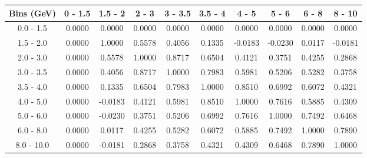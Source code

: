 \documentclass[aps, prd, reprint,showpacs,  preprintnumbers,amsmath,amssymb,superscriptaddress, nofootinbib]{revtex4-1}
\makeatletter
\renewenvironment{table}
  {\def\@captype{table}}
  {}
\makeatother
\begin{document}
\vspace{0.3cm}


\begin{table}
\centering
\begin{tabular}{cccccccccc}
\hline
Bins (GeV) & 0 - 1.5 & 1.5 - 2 & 2 - 3 & 3 - 3.5 & 3.5 - 4 & 4 - 5 & 5 - 6 & 6 - 8 & 8 - 10 \\ 
\hline
0.0 - 1.5 & 0.0000 & 0.0000 & 0.0000 & 0.0000 & 0.0000 & 0.0000 & 0.0000 & 0.0000 & 0.0000 \\ 
1.5 - 2.0 & 0.0000 & 1.0000 & 0.5578 & 0.4056 & 0.1335 & -0.0183 & -0.0230 & 0.0117 & -0.0181 \\ 
2.0 - 3.0 & 0.0000 & 0.5578 & 1.0000 & 0.8717 & 0.6504 & 0.4121 & 0.3751 & 0.4255 & 0.2868 \\ 
3.0 - 3.5 & 0.0000 & 0.4056 & 0.8717 & 1.0000 & 0.7983 & 0.5981 & 0.5206 & 0.5282 & 0.3758 \\ 
3.5 - 4.0 & 0.0000 & 0.1335 & 0.6504 & 0.7983 & 1.0000 & 0.8510 & 0.6992 & 0.6072 & 0.4321 \\ 
4.0 - 5.0 & 0.0000 & -0.0183 & 0.4121 & 0.5981 & 0.8510 & 1.0000 & 0.7616 & 0.5885 & 0.4309 \\ 
5.0 - 6.0 & 0.0000 & -0.0230 & 0.3751 & 0.5206 & 0.6992 & 0.7616 & 1.0000 & 0.7492 & 0.6468 \\ 
6.0 - 8.0 & 0.0000 & 0.0117 & 0.4255 & 0.5282 & 0.6072 & 0.5885 & 0.7492 & 1.0000 & 0.7890 \\ 
8.0 - 10.0 & 0.0000 & -0.0181 & 0.2868 & 0.3758 & 0.4321 & 0.4309 & 0.6468 & 0.7890 & 1.0000 \\ 
\hline
\hline
\end{tabular}
\caption{Correlation matrix for bins of $\sigma(E_\nu)$.}
\label{tb:pip_Enu_cov}
\end{table}


\vspace{0.7cm}
\end{document}
